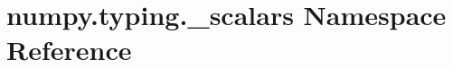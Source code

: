 \hypertarget{namespacenumpy_1_1typing_1_1__scalars}{}\section{numpy.\+typing.\+\_\+scalars Namespace Reference}
\label{namespacenumpy_1_1typing_1_1__scalars}
